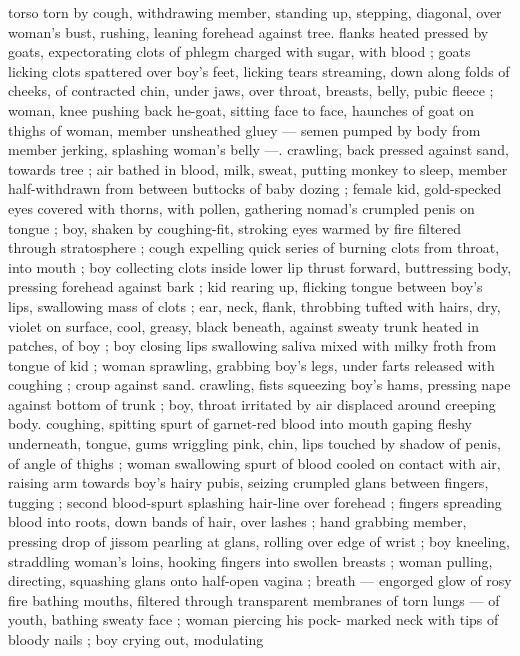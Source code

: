 torso torn by cough, withdrawing member, standing up, stepping, 
diagonal, over woman's bust, rushing, leaning forehead against tree. 
flanks heated pressed by goats, expectorating clots of phlegm 
charged with sugar, with blood ; goats licking clots spattered over 
boy's feet, licking tears streaming, down along folds of cheeks, of 
contracted chin, under jaws, over throat, breasts, belly, pubic fleece 
; woman, knee pushing back he-goat, sitting face to face, haunches 
of goat on thighs of woman, member unsheathed gluey --- semen 
pumped by body from member jerking, splashing woman's belly ---. 
crawling, back pressed against sand, towards tree ; air bathed in 
blood, milk, sweat, putting monkey to sleep, member half-withdrawn 
from between buttocks of baby dozing ; female kid, gold-specked 
eyes covered with thorns, with pollen, gathering nomad's crumpled 
penis on tongue ; boy, shaken by coughing-fit, stroking eyes warmed 
by fire filtered through stratosphere ; cough expelling quick series of 
burning clots from throat, into mouth ; boy collecting clots inside 
lower lip thrust forward, buttressing body, pressing forehead against 
bark ; kid rearing up, flicking tongue between boy's lips, swallowing 
mass of clots ; ear, neck, flank, throbbing tufted with hairs, dry, violet 
on surface, cool, greasy, black beneath, against sweaty trunk heated 
in patches, of boy ; boy closing lips swallowing saliva mixed with 
milky froth from tongue of kid ; woman sprawling, grabbing boy's 
legs, under farts released with coughing ; croup against sand. 
crawling, fists squeezing boy's hams, pressing nape against bottom 
of trunk ; boy, throat irritated by air displaced around creeping body. 
coughing, spitting spurt of garnet-red blood into mouth gaping 
fleshy underneath, tongue, gums wriggling pink, chin, lips touched 
by shadow of penis, of angle of thighs ; woman swallowing spurt of 
blood cooled on contact with air, raising arm towards boy's hairy 
pubis, seizing crumpled glans between fingers, tugging ; second 
blood-spurt splashing hair-line over forehead ; fingers spreading 
blood into roots, down bands of hair, over lashes ; hand grabbing 
member, pressing {\col} drop of jissom pearling at glans, rolling over 
edge of wrist ; boy kneeling, straddling woman's loins, hooking 
fingers into swollen breasts ; woman pulling, directing, squashing 
glans onto half-open vagina ; breath --- engorged glow of rosy fire 
bathing mouths, filtered through transparent membranes of torn 
lungs --- of youth, bathing sweaty face ; woman piercing his pock- 
marked neck with tips of bloody nails ; boy crying out, modulating 
